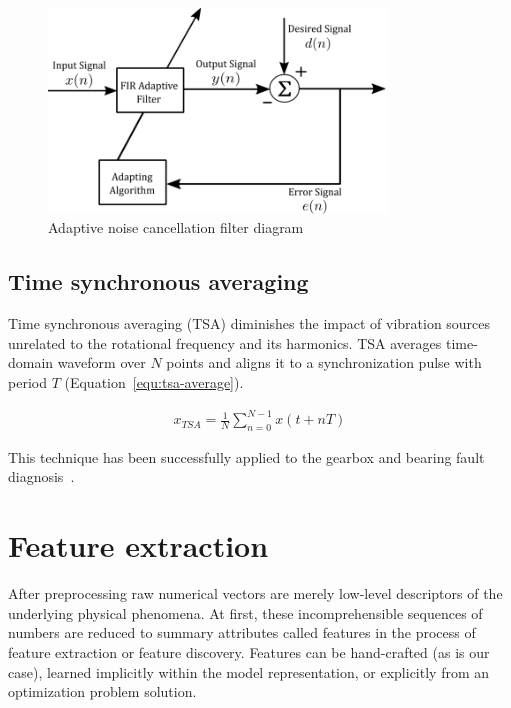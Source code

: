 \begin{figure}[h]
	\centering
	\includegraphics[width=0.8\textwidth]{assets/analysis/adaptive-filter.png}
	\caption{Adaptive noise cancellation filter diagram}
	\label{fig:adaptive-filter}
\end{figure}
\bigbreak

\subsection{Time synchronous averaging}
Time synchronous averaging (TSA) diminishes the impact of vibration sources unrelated to the rotational frequency and its harmonics. TSA averages time-domain waveform over $N$ points and aligns it to a synchronization pulse with period $T$ (Equation~\ref{equ:tsa-average}). 

\begin{ceqn}\begin{align}
x_{TSA} = \frac{1}{N} \sum_{n = 0}^{N - 1}{x(t + nT)}
\label{equ:tsa-average}
\end{align}\end{ceqn} 

This technique has been successfully applied to the gearbox and bearing fault diagnosis~\cite{davies_handbook_2012,nandi_condition_2019}.

\section{Feature extraction} \label{section:feature-extraction}
After preprocessing raw numerical vectors are merely low-level descriptors of the underlying physical phenomena. At first, these incomprehensible sequences of numbers are reduced to summary attributes called features in the process of feature extraction or feature discovery. Features can be hand-crafted (as is our case), learned implicitly within the model representation, or explicitly from an optimization problem solution. 

